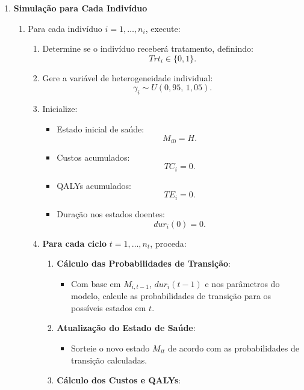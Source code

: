 \documentclass[12pt]{article}
\theoremstyle{break}
\begin{document}
\begin{enumerate}
    \item \textbf{Simulação para Cada Indivíduo}
    \begin{enumerate}[label=\alph*)]
        \item Para cada indivíduo $i = 1, \dotsc, n_i$, execute:
        \begin{enumerate}[label=\roman*)]
            \item Determine se o indivíduo receberá tratamento, definindo:
            \[
            Trt_i \in \{0, 1\}.
            \]
            \item Gere a variável de heterogeneidade individual:
            \[
            \gamma_i \sim U(0{,}95,\, 1{,}05).
            \]
            \item Inicialize:
            \begin{itemize}
                \item Estado inicial de saúde:
                \[
                M_{i0} = H.
                \]
                \item Custos acumulados:
                \[
                TC_i = 0.
                \]
                \item QALYs acumulados:
                \[
                TE_i = 0.
                \]
                \item Duração nos estados doentes:
                \[
                dur_i(0) = 0.
                \]
            \end{itemize}
            \item \textbf{Para cada ciclo} $t = 1, \dotsc, n_t$, proceda:
            \begin{enumerate}[label=\alph*)]
                \item \textbf{Cálculo das Probabilidades de Transição}:
                \begin{itemize}
                    \item Com base em $M_{i,t-1}$, $dur_i(t-1)$ e nos parâmetros do modelo, calcule as probabilidades de transição para os possíveis estados em $t$.
                \end{itemize}
                \item \textbf{Atualização do Estado de Saúde}:
                \begin{itemize}
                    \item Sorteie o novo estado $M_{it}$ de acordo com as probabilidades de transição calculadas.
                \end{itemize}
                \item \textbf{Cálculo dos Custos e QALYs}:

\end{enumerate}
\end{enumerate}
\end{enumerate}
\end{enumerate}
\end{document}
